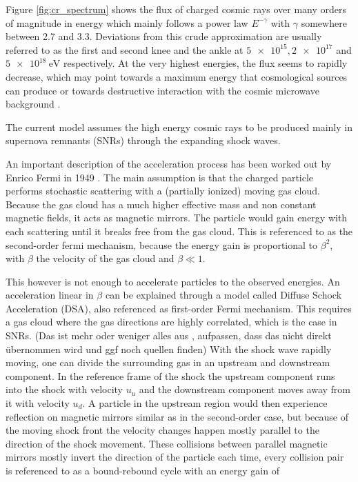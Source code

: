 Figure \ref{fig:cr_spectrum} shows the flux of charged cosmic rays over 
many orders of magnitude in energy which mainly follows 
a power law $E^{-\gamma}$ with $\gamma$ somewhere between 
2.7 and 3.3. Deviations from this crude approximation are 
usually referred to as the first and second knee and the ankle 
at $\num{5e15}, \num{2e17}$ and $\SI{5e18}{\electronvolt}$ respectively.
At the very highest energies, the flux seems to rapidly decrease,
which may point towards a maximum energy
that cosmological sources can produce or towards destructive interaction with 
the cosmic microwave background \cite{bookap}.

The current model assumes the high energy cosmic rays to be produced 
mainly in supernova remnants (SNRs) through the expanding shock waves.

An important description of the acceleration process has been
worked out by Enrico Fermi in 1949 \cite{PhysRev.75.1169}.
The main assumption is that the charged particle performs 
stochastic scattering with a (partially ionized) moving gas cloud.
Because the gas cloud has a much higher effective mass and
non constant magnetic fields, it acts as magnetic mirrors.
The particle would gain energy with each scattering until it breaks free from the 
gas cloud. This is referenced to as the second-order fermi mechanism, 
because the energy gain is proportional to $\beta^2$, with $\beta$
the velocity of the gas cloud and $\beta \ll 1$.

This however is not enough to accelerate particles to the observed energies.
An acceleration linear in $\beta$ can be explained through a model called
Diffuse Schock Acceleration (DSA), also referenced as first-order
Fermi mechanism.
This requires a gas cloud where the gas directions are highly correlated,
which is the case in SNRs.
(Das ist mehr oder weniger alles aus \cite{bookap}, 
aufpassen, dass das nicht direkt übernommen wird und ggf noch quellen finden)
With the shock wave rapidly moving, one can divide the surrounding gas in 
an upstream and downstream component. In the reference frame of the shock
the upstream component runs into the shock with 
velocity $u_u$ and the downstream component moves away from 
it with velocity $u_d$.
A particle in the upstream region would then experience reflection on 
magnetic mirrors similar as in the second-order case, but because of the 
moving shock front the velocity changes happen mostly 
parallel to the direction of the shock movement.
These collisions between parallel magnetic mirrors mostly
invert the direction of the particle each time, every collision pair 
is referenced to as a bound-rebound cycle with an energy gain of 

